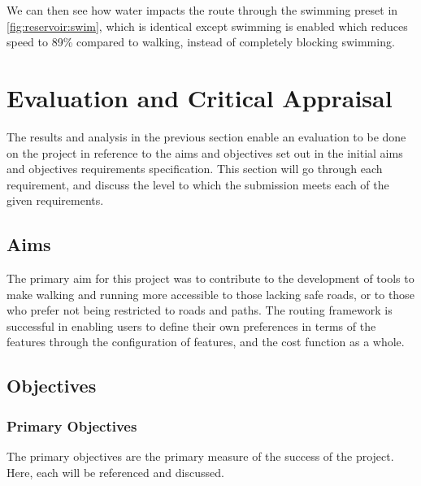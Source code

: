 \documentclass[12pt]{article}
\begin{document}
We can then see how water impacts the route through the swimming preset in \autoref{fig:reservoir:swim}, which is identical except swimming is enabled which reduces speed to 89\% compared to walking, instead of completely blocking swimming.

\section{Evaluation and Critical Appraisal}

The results and analysis in the previous section enable an evaluation to be done on the project in reference to the aims and objectives set out in the initial aims and objectives requirements specification. This section will go through each requirement, and discuss the level to which the submission meets each of the given requirements.

\subsection{Aims}

The primary aim for this project was to contribute to the development of tools to make walking and running more accessible to those lacking safe roads, or to those who prefer not being restricted to roads and paths. The routing framework is successful in enabling users to define their own preferences in terms of the features through the configuration of features, and the cost function as a whole.

\subsection{Objectives}

\subsubsection{Primary Objectives}

The primary objectives are the primary measure of the success of the project. Here, each will be referenced and discussed.
\end{document}
